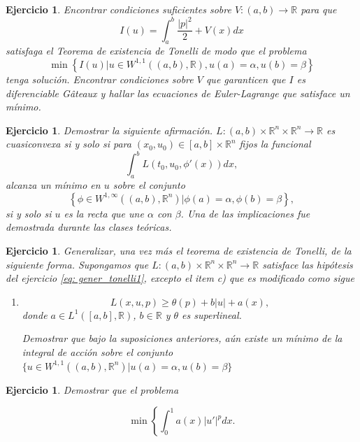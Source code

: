 \documentclass{article}
\newcounter{ejer}
\newtheorem{ejercicio}[ejer]{Ejercicio}}
\newcommand{\rr}{\mathbb{R}}
\begin{document}
\begin{ejercicio} Encontrar condiciones suficientes sobre $V:(a,b)\to\rr$ para que
\[I(u)=\int_a^b\frac{|p|^2}{2}+V(x)dx\]
satisfaga el Teorema de existencia de Tonelli de modo que el problema
\[\min\left\{I(u)\bigg| u\in W^{1,1}((a,b),\rr), u(a)=\alpha, u(b)=\beta\right\}\]
tenga solución. Encontrar condiciones  sobre $V$ que garanticen que $I$ es diferenciable G\^ateaux y hallar las ecuaciones de Euler-Lagrange que satisface un mínimo.

\end{ejercicio}

\begin{ejercicio} Demostrar la siguiente afirmación. $L:(a,b)\times\rr^n\times\rr^n\to\rr$ es cuasiconvexa si y solo si para $(x_0,u_0)\in [a,b]\times\rr^n$ fijos la funcional
\[\int_a^bL(t_0,u_0,\phi'(x))dx,\]
alcanza un mínimo en $u$ sobre el conjunto
\[\left\{\phi\in W^{1,\infty}((a,b),\rr^n)| \phi(a)=\alpha, \phi(b)=\beta\right\},\]
si y solo si $u$ es la recta que une $\alpha$ con $\beta$. Una de las implicaciones fue demostrada durante las clases teóricas.

\end{ejercicio}

\begin{ejercicio} Generalizar, una vez más el teorema de existencia de Tonelli, de la siguiente forma.  Supongamos que $L:(a,b)\times\rr^n\times\rr^n\to\rr$ satisface las hipótesis del ejercicio \ref{eq: gener_tonelli1}, excepto el item c) que es modificado como sigue
\begin{enumerate}
 \item[c')] \[L(x,u,p)\geq \theta(p)+b|u|+a(x),\]
 donde $a\in L^1([a,b],\rr)$, $b\in\rr$  y $\theta$ es superlineal.

 Demostrar que bajo la suposiciones anteriores, aún existe un mínimo de la integral de acción sobre el conjunto $\{u\in W^{1,1}((a,b),\rr^n)| u(a)=\alpha, u(b)=\beta\}$
\end{enumerate}


\end{ejercicio}


\begin{ejercicio} Demostrar que el problema

\[\min\left\{\int_0^1a(x)|u'|^pdx.\]

\end{ejercicio}
\end{document}
